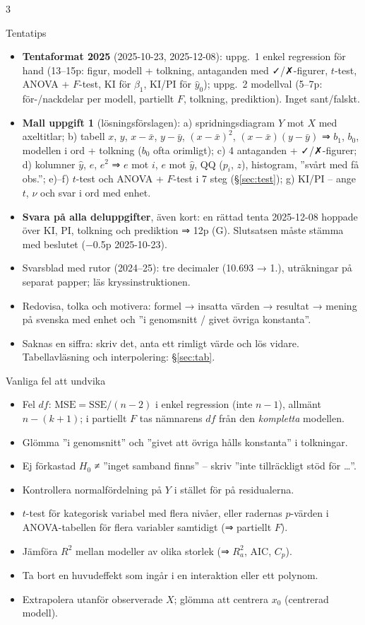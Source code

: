 \documentclass[8pt]{extarticle}
\makeatletter
\newcounter{sect}
\newcommand{\sect}[3][hd]{\par\vspace{1.5pt}\refstepcounter{sect}\noindent
  {\setlength{\fboxsep}{1.8pt}\colorbox{#1}{\parbox{\dimexpr\linewidth-2\fboxsep}{\color{white}\sffamily\bfseries
  \strut\thesect\enspace #2}}}\label{#3}\par\nobreak\vspace{0.8pt}\@afterheading}
\newcommand{\SSE}{\mathrm{SSE}}
\newcommand{\MSE}{\mathrm{MSE}}
\makeatother
\begin{document}
\begin{multicols*}{3}
\sect[cTenta]{Tentatips}{sec:tips}
\begin{itemize}
\item \textbf{Tentaformat 2025} (2025-10-23, 2025-12-08): uppg.\ 1 enkel regression för hand (13–15p: figur, modell + tolkning, antaganden med ✓/✗-figurer, $t$-test, ANOVA + $F$-test, KI för $\beta_1$, KI/PI för $\hat y_0$); uppg.\ 2 modellval (5–7p: för-/nackdelar per modell, partiellt $F$, tolkning, prediktion). Inget sant/falskt.
\item \textbf{Mall uppgift 1} (lösningsförslagen): a) spridningsdiagram $Y$ mot $X$ med axeltitlar; b) tabell $x$, $y$, $x-\bar x$, $y-\bar y$, $(x-\bar x)^2$, $(x-\bar x)(y-\bar y)$ ⇒ $b_1$, $b_0$, modellen i ord + tolkning ($b_0$ ofta orimligt); c) 4 antaganden + ✓/✗-figurer; d) kolumner $\hat y$, $e$, $e^2$ ⇒ $e$ mot $i$, $e$ mot $\hat y$, QQ ($p_i$, $z$), histogram, ”svårt med få obs.”; e)–f) $t$-test och ANOVA + $F$-test i 7 steg (§\ref{sec:test}); g) KI/PI – ange $t$, $\nu$ och svar i ord med enhet.
\item \textbf{Svara på alla deluppgifter}, även kort: en rättad tenta 2025-12-08 hoppade över KI, PI, tolkning och prediktion ⇒ 12p (G). Slutsatsen måste stämma med beslutet (−0.5p 2025-10-23).
\item Svarsblad med rutor (2024–25): tre decimaler (10.693 → 1\;.), uträkningar på separat papper; läs kryssinstruktionen.
\item Redovisa, tolka och motivera: formel → insatta värden → resultat → mening på svenska med enhet och ”i genomsnitt / givet övriga konstanta”.
\item Saknas en siffra: skriv det, anta ett rimligt värde och lös vidare. Tabellavläsning och interpolering: §\ref{sec:tab}.
\end{itemize}

\sect[cTenta]{Vanliga fel att undvika}{sec:fel}
\begin{itemize}[label=✗]
\item Fel $df$: $\MSE=\SSE/(n-2)$ i enkel regression (inte $n-1$), allmänt $n-(k+1)$; i partiellt $F$ tas nämnarens $df$ från den \emph{kompletta} modellen.
\item Glömma ”i genomsnitt” och ”givet att övriga hålls konstanta” i tolkningar.
\item Ej förkastad $H_0$ ≠ ”inget samband finns” – skriv ”inte tillräckligt stöd för …”.
\item Kontrollera normalfördelning på $Y$ i stället för på residualerna.
\item $t$-test för kategorisk variabel med flera nivåer, eller radernas $p$-värden i ANOVA-tabellen för flera variabler samtidigt (⇒ partiellt $F$).
\item Jämföra $R^2$ mellan modeller av olika storlek (⇒ $R^2_a$, AIC, $C_p$).
\item Ta bort en huvudeffekt som ingår i en interaktion eller ett polynom.
\item Extrapolera utanför observerade $X$; glömma att centrera $x_0$ (centrerad modell).
\end{itemize}


\end{multicols*}
\end{document}
